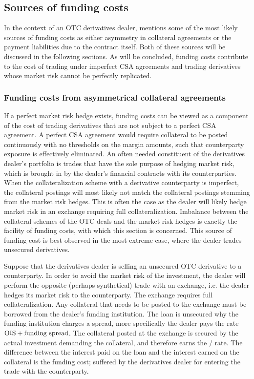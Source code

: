 \documentclass[../../../main.tex]{subfiles}
\begin{document}
    \subsection{Sources of funding costs}
        In the context of an OTC derivatives dealer, 
        \cite{Ruiz2013FVA} mentions some of the most likely sources of funding costs as
        either asymmetry in collateral agreements or the payment liabilities due to the contract itself.
        Both of these sources will be discussed in the following sections.
        As will be concluded, funding costs contribute to the cost of trading under imperfect CSA agreements 
        and trading derivatives whose market risk cannot be perfectly replicated.

    \subsubsection{Funding costs from asymmetrical collateral agreements}
        If a perfect market risk hedge exists, funding costs can be viewed 
        as a component of the cost of trading derivatives that are not subject to a perfect CSA agreement.
        A perfect CSA agreement would require collateral to be posted continuously with no thresholds on the margin amounts,
        such that counterparty exposure is effectively eliminated.
        An often needed constituent of the derivatives dealer's portfolio
        is trades that have the sole purpose of hedging market risk,
        which is brought in by the dealer's financial contracts with its counterparties.
        When the collateralization scheme with a derivative counterparty is imperfect, 
        the collateral postings will most likely not match the collateral postings stemming from the market risk hedges.
        This is often the case as the dealer will likely hedge market risk in an exchange requiring full collateralization.
        Imbalance between the collateral schemes of the OTC deals and the market risk hedges
        is exactly the facility of funding costs, with which this section is concerned.
        This source of funding cost is best observed in the most extreme case, where the dealer trades unsecured derivatives. 

        Suppose that the derivatives dealer is selling an unsecured OTC derivative to a counterparty.
        In order to avoid the market risk of the investment, 
        the dealer will perform the opposite (perhaps synthetical) trade with an exchange,
        i.e. the dealer hedges its market risk to the counterparty.
        The exchange requires full collateralization.
        Any collateral that needs to be posted to the exchange must be borrowed from the dealer's funding institution.
        The loan is unsecured why the funding institution charges a spread,
        more specifically the dealer pays the rate $\OIS/ + \text{funding spread}$.
        The collateral posted at the exchange is secured by the actual investment demanding the collateral,
        and therefore earns the \OIS/ rate.
        The difference between the interest paid on the loan and the interest earned on the collateral is the funding cost;
        suffered by the derivatives dealer for entering the trade with the counterparty. 
\end{document}
